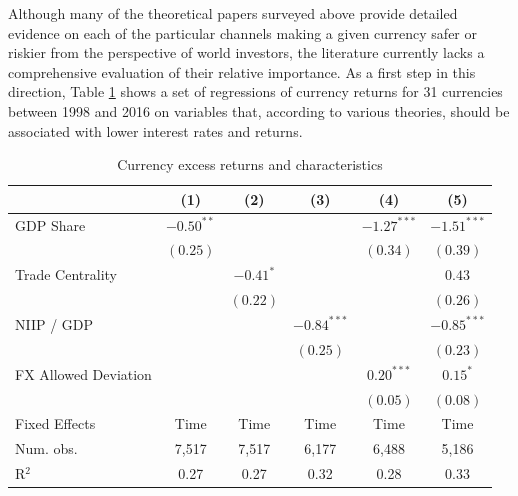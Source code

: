 \documentclass{ar-1col}
\begin{document}
Although many of the theoretical papers surveyed above provide detailed evidence on each of the particular channels making a given currency safer or riskier from the perspective of world investors, the literature currently lacks a comprehensive evaluation of their relative importance. As a first step in this direction, Table \ref{table:rx_char} shows a set of regressions of currency returns for 31 currencies between 1998 and 2016 on variables that, according to various theories, should be associated with lower interest rates and returns. 
\begin{table}[htp]
\begin{center}
\caption{Currency excess returns and characteristics}
\label{table:rx_char}
\vspace{1em}
\begin{tabular}{l c c c c c }
\hline
\hline
 & (1) & (2) & (3) & (4) & (5) \\
\hline
GDP Share               & $-0.50^{**}$ &             &               & $-1.27^{***}$ & $-1.51^{***}$ \\
                        & $(0.25)$     &             &               & $(0.34)$      & $(0.39)$      \\
Trade Centrality              &              & $-0.41^{*}$ &               &               & $0.43$        \\
                        &              & $(0.22)$    &               &               & $(0.26)$      \\
NIIP / GDP              &              &             & $-0.84^{***}$ &               & $-0.85^{***}$ \\
                        &              &             & $(0.25)$      &               & $(0.23)$      \\
FX Allowed Deviation         &              &             &               & $0.20^{***}$  & $0.15^{*}$    \\
                        &              &             &               & $(0.05)$      & $(0.08)$      \\
\hline
Fixed Effects & Time & Time & Time & Time & Time \\
Num. obs.     & 7,517        & 7,517     & 6,177          & 6,488          & 5,186          \\
R$^2$         & 0.27        & 0.27     & 0.32          & 0.28          & 0.33          \\
\hline
\hline
\end{tabular}
\end{center}

\end{table}
\end{document}
